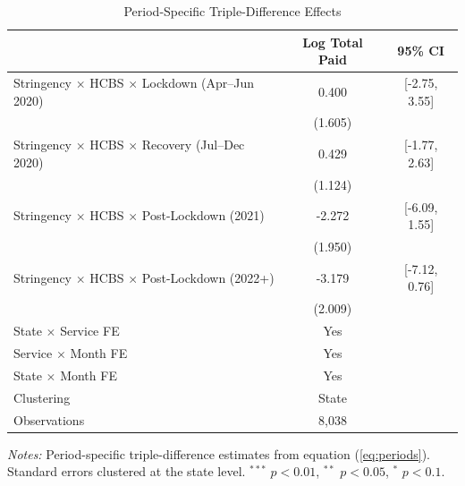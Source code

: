 \begin{table}[htbp]
\centering
\caption{Period-Specific Triple-Difference Effects}
\label{tab:periods}
\begin{tabular}{lcc}
\hline\hline
 & Log Total Paid & 95\% CI \\
\hline
Stringency $\times$ HCBS $\times$ Lockdown (Apr--Jun 2020) & 0.400 & [-2.75, 3.55] \\
 & (1.605) & \\[3pt]
Stringency $\times$ HCBS $\times$ Recovery (Jul--Dec 2020) & 0.429 & [-1.77, 2.63] \\
 & (1.124) & \\[3pt]
Stringency $\times$ HCBS $\times$ Post-Lockdown (2021) & -2.272 & [-6.09, 1.55] \\
 & (1.950) & \\[3pt]
Stringency $\times$ HCBS $\times$ Post-Lockdown (2022+) & -3.179 & [-7.12, 0.76] \\
 & (2.009) & \\[3pt]
\hline
State $\times$ Service FE & Yes & \\
Service $\times$ Month FE & Yes & \\
State $\times$ Month FE & Yes & \\
Clustering & State & \\
Observations & 8,038 & \\
\hline\hline
\end{tabular}
\begin{minipage}{0.75\textwidth}
\vspace{4pt}
\footnotesize
\textit{Notes:} Period-specific triple-difference estimates from equation (\ref{eq:periods}). Standard errors clustered at the state level. $^{***}$ $p<0.01$, $^{**}$ $p<0.05$, $^{*}$ $p<0.1$.
\end{minipage}
\end{table}
